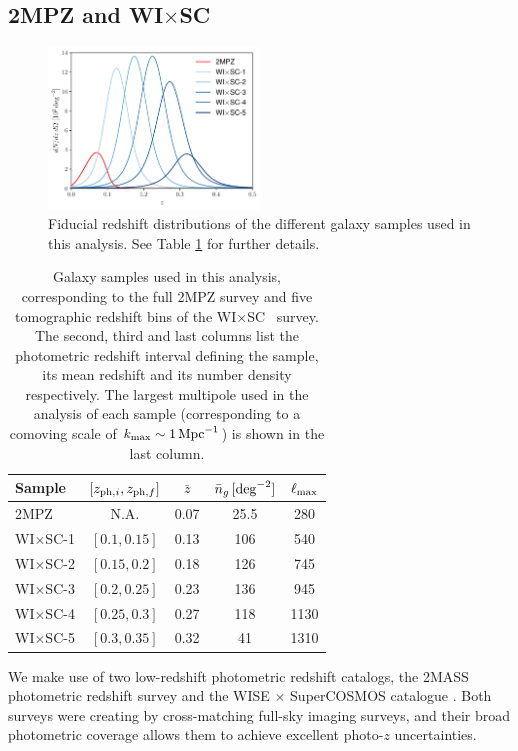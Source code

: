 \documentclass[useAMS,usenatbib]{mn2e}
\newcommand{\wisc}{WI$\times$SC}
\begin{document}
  \subsection{2MPZ and \wisc}\label{ssec:data.g1}
    \begin{figure}
      \centering
      \includegraphics[width=0.5\textwidth]{nzs.pdf}
      \caption{Fiducial redshift distributions of the different galaxy samples used in this analysis. See Table \ref{tab:z_bins} for further details.}
      \label{fig:dndz}
    \end{figure}
    \begin{table}
      \begin{center}
        \begin{tabular}{l|cccc}
          \hline
          Sample & $[z_{{\rm ph},i},z_{{\rm ph},f}]$ & $\bar{z}$ & $\bar{n}_g\,[{\rm deg}^{-2}]$ & $\ell_{\rm max}$\\[1ex]
          \hline
          2MPZ    & N.A.         & 0.07 &  25.5 &  280 \\
          \wisc-1 & $[0.1,0.15]$ & 0.13 & 106   &  540 \\
          \wisc-2 & $[0.15,0.2]$ & 0.18 & 126   &  745 \\
          \wisc-3 & $[0.2,0.25]$ & 0.23 & 136   &  945 \\
          \wisc-4 & $[0.25,0.3]$ & 0.27 & 118   & 1130 \\
          \wisc-5 & $[0.3,0.35]$ & 0.32 & 41    & 1310 \\
          \hline
        \end{tabular}
        \caption{Galaxy samples used in this analysis, corresponding to the full 2MPZ survey and five tomographic redshift bins of the \wisc~ survey. The second, third and last columns list the photometric redshift interval defining the sample, its mean redshift and its number density respectively. The largest multipole used in the analysis of each sample (corresponding to a comoving scale of $k_{\rm max}\sim 1\,{\rm Mpc}^{-1}$) is shown in the last column.}\label{tab:z_bins}
      \end{center}
    \end{table} 
    We make use of two low-redshift photometric redshift catalogs, the 2MASS photometric redshift survey \citep[2MPZ,][]{2014ApJS..210....9B} and the WISE $\times$ SuperCOSMOS catalogue \citep[\wisc,][]{2016ApJS..225....5B}. Both surveys were creating by cross-matching full-sky imaging surveys, and their broad photometric coverage allows them to achieve excellent photo-$z$ uncertainties.
    
\end{document}
